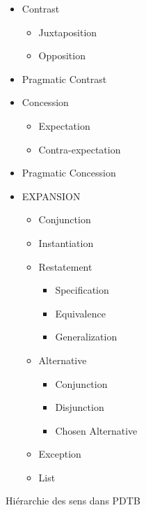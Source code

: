 \documentclass{KodeBook}
\begin{document}
\begin{figure}[!ht]
\begin{minipage}{.3\textwidth}
\begin{itemize}
	\begin{itemize}
		\item Contrast
		\begin{itemize}
			\item Juxtaposition 
			\item Opposition
		\end{itemize}
		\item Pragmatic Contrast
		\item Concession
		\begin{itemize}
			\item Expectation
			\item Contra-expectation
		\end{itemize}
		\item Pragmatic Concession
	\end{itemize}
\end{itemize}
\end{minipage}
\begin{minipage}{.3\textwidth}
	\scriptsize\bfseries
	\begin{itemize}
		\item EXPANSION
		\begin{itemize}
			\item Conjunction
			\item Instantiation
			\item Restatement
			\begin{itemize}
				\item Specification
				\item Equivalence
				\item Generalization
			\end{itemize}
			\item Alternative
			\begin{itemize}
				\item Conjunction
				\item Disjunction
				\item Chosen Alternative
			\end{itemize}
			\item Exception
			\item List
		\end{itemize}
	\end{itemize}
\end{minipage}\vspace{-0.5cm}
	\caption[Hiérarchie des sens dans PDTB]{Hiérarchie des sens dans PDTB \cite{2008-prasad-al}}
	\label{fig:pdtb-rel}
\end{figure}
\end{document}
